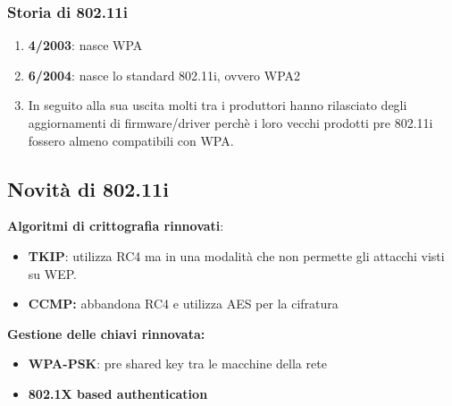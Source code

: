 \documentclass[12pt]{article}
\begin{document}
			\subsubsection{Storia di 802.11i}
				\begin{enumerate}
					\item \textbf{4/2003}: nasce WPA
					\item \textbf{6/2004}: nasce lo standard 802.11i, ovvero WPA2
					\item In seguito alla sua uscita molti tra i produttori hanno rilasciato degli aggiornamenti di firmware/driver perchè i loro vecchi prodotti pre 802.11i fossero almeno compatibili con WPA.
				\end{enumerate}	
			\subsection{Novità di 802.11i}
			\textbf{Algoritmi di crittografia rinnovati}:
			\begin{itemize}
				\item  \textbf{TKIP}: utilizza RC4 ma in una modalità che non permette gli attacchi visti su WEP.
				\item \textbf{CCMP:} abbandona RC4 e utilizza AES per la cifratura 
			\end{itemize}
			\textbf{Gestione delle chiavi rinnovata:}
			\begin{itemize}
				\item \textbf{WPA-PSK}: pre shared key tra le macchine della rete
				\item \textbf{802.1X based authentication}	
			\end{itemize}
			
				
			  
			
			
			
			
			
			
			
				
				
				
				
				
				
				
				
				
				
			
		
			
			
			
				
				
				
				
				
			
			
		
		
		
				
				
				
		
			
			
				
			
			
			
			 
						
		
		
		
			
		
				 
\end{document}
